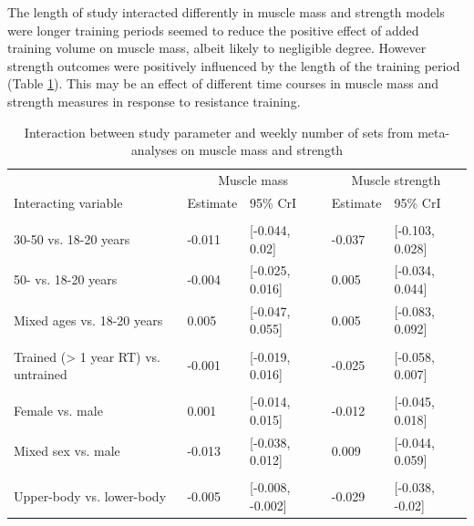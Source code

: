 \documentclass[twoside,10pt]{gihclass} %
\begin{document}
The length of study interacted differently in muscle mass and strength models were longer training periods seemed to reduce the positive effect of added training volume on muscle mass, albeit likely to negligible degree. However strength outcomes were positively influenced by the length of the training period (Table \ref{tab:meta-interaction-table}). This may be an effect of different time courses in muscle mass and strength measures in response to resistance training.
\begin{table}

\caption{\label{tab:meta-interaction-table}Interaction between study parameter and weekly number of sets from meta-analyses on muscle mass and strength}
\centering
\fontsize{7}{9}\selectfont
\begin{tabular}[t]{lllll}
\toprule
\multicolumn{1}{c}{ } & \multicolumn{2}{c}{Muscle mass} & \multicolumn{2}{c}{Muscle strength} \\
\cmidrule(l{3pt}r{3pt}){2-3} \cmidrule(l{3pt}r{3pt}){4-5}
Interacting variable & Estimate & 95\% CrI & Estimate & 95\% CrI\\
\midrule
\addlinespace[0.3em]
\multicolumn{5}{l}{\textbf{Age}}\\
\hspace{1em}30-50 vs. 18-20 years & -0.011 & [-0.044, 0.02] & -0.037 & [-0.103, 0.028]\\
\hspace{1em}50- vs. 18-20 years & -0.004 & [-0.025, 0.016] & 0.005 & [-0.034, 0.044]\\
\hspace{1em}Mixed ages vs. 18-20 years & 0.005 & [-0.047, 0.055] & 0.005 & [-0.083, 0.092]\\
\addlinespace[0.3em]
\multicolumn{5}{l}{\textbf{Training status}}\\
\hspace{1em}Trained (> 1 year RT) vs. untrained & -0.001 & [-0.019, 0.016] & -0.025 & [-0.058, 0.007]\\
\addlinespace[0.3em]
\multicolumn{5}{l}{\textbf{Sex}}\\
\hspace{1em}Female vs. male & 0.001 & [-0.014, 0.015] & -0.012 & [-0.045, 0.018]\\
\hspace{1em}Mixed sex vs. male & -0.013 & [-0.038, 0.012] & 0.009 & [-0.044, 0.059]\\
\addlinespace[0.3em]
\multicolumn{5}{l}{\textbf{Body portion}}\\
\hspace{1em}Upper-body vs. lower-body & -0.005 & [-0.008, -0.002] & -0.029 & [-0.038, -0.02]\\

\end{tabular}
\end{table}
\end{document}

